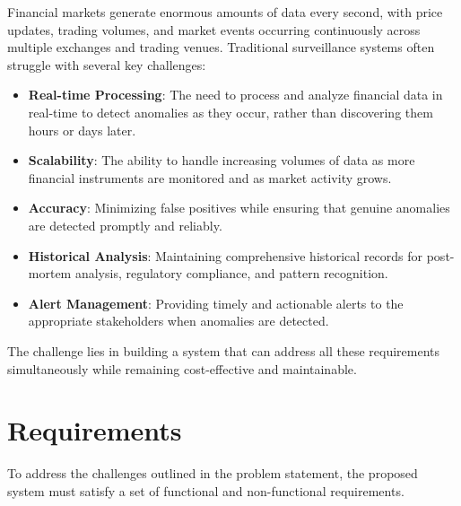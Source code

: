 Financial markets generate enormous amounts of data every second, with price updates, trading volumes, and market events occurring continuously across multiple exchanges and trading venues. Traditional surveillance systems often struggle with several key challenges:
% 
\begin{itemize}
    \item \textbf{Real-time Processing}: The need to process and analyze financial data in real-time to detect anomalies as they occur, rather than discovering them hours or days later.
    
    \item \textbf{Scalability}: The ability to handle increasing volumes of data as more financial instruments are monitored and as market activity grows.
    
    \item \textbf{Accuracy}: Minimizing false positives while ensuring that genuine anomalies are detected promptly and reliably.
    
    \item \textbf{Historical Analysis}: Maintaining comprehensive historical records for post-mortem analysis, regulatory compliance, and pattern recognition.
    
    \item \textbf{Alert Management}: Providing timely and actionable alerts to the appropriate stakeholders when anomalies are detected.
\end{itemize}

The challenge lies in building a system that can address all these requirements simultaneously while remaining cost-effective and maintainable.
\section{Requirements}

To address the challenges outlined in the problem statement, the proposed system must satisfy a set of functional and non-functional requirements.

